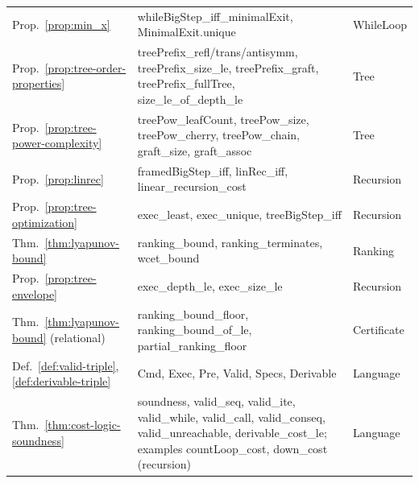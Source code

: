 \documentclass[oneside,english]{amsart}
\numberwithin{equation}{section}
\numberwithin{figure}{section}
\theoremstyle{plain}
\theoremstyle{definition}
\theoremstyle{plain}
\theoremstyle{remark}
\theoremstyle{plain}
\theoremstyle{definition}
\theoremstyle{plain}
\theoremstyle{remark}
\newcommand{\lean}[1]{{\ttfamily\small #1}}
\begin{document}
\begin{table}[ht]
\begin{tabular}{@{}>{\raggedright\arraybackslash}p{}>{\raggedright\arraybackslash}p{}>{\raggedright\arraybackslash}p{}@{}}
Prop.~\ref{prop:min_x} & \lean{whileBigStep\_\allowbreak iff\_\allowbreak minimalExit}, \lean{MinimalExit.\allowbreak unique} & \lean{WhileLoop} \\
Prop.~\ref{prop:tree-order-properties} & \lean{treePrefix\_\allowbreak refl/\allowbreak trans/\allowbreak antisymm}, \lean{treePrefix\_\allowbreak size\_\allowbreak le}, \lean{treePrefix\_\allowbreak graft}, \lean{treePrefix\_\allowbreak fullTree}, \lean{size\_\allowbreak le\_\allowbreak of\_\allowbreak depth\_\allowbreak le} & \lean{Tree} \\
Prop.~\ref{prop:tree-power-complexity} & \lean{treePow\_\allowbreak leafCount}, \lean{treePow\_\allowbreak size}, \lean{treePow\_\allowbreak cherry}, \lean{treePow\_\allowbreak chain}, \lean{graft\_\allowbreak size}, \lean{graft\_\allowbreak assoc} & \lean{Tree} \\
Prop.~\ref{prop:linrec} & \lean{framedBigStep\_\allowbreak iff}, \lean{linRec\_\allowbreak iff}, \lean{linear\_\allowbreak recursion\_\allowbreak cost} & \lean{Recursion} \\
Prop.~\ref{prop:tree-optimization} & \lean{exec\_\allowbreak least}, \lean{exec\_\allowbreak unique}, \lean{treeBigStep\_\allowbreak iff} & \lean{Recursion} \\
Thm.~\ref{thm:lyapunov-bound} & \lean{ranking\_\allowbreak bound}, \lean{ranking\_\allowbreak terminates}, \lean{wcet\_\allowbreak bound} & \lean{Ranking} \\
Prop.~\ref{prop:tree-envelope} & \lean{exec\_\allowbreak depth\_\allowbreak le}, \lean{exec\_\allowbreak size\_\allowbreak le} & \lean{Recursion} \\
Thm.~\ref{thm:lyapunov-bound} (relational) & \lean{ranking\_\allowbreak bound\_\allowbreak floor}, \lean{ranking\_\allowbreak bound\_\allowbreak of\_\allowbreak le}, \lean{partial\_\allowbreak ranking\_\allowbreak floor} & \lean{Certificate} \\
Def.~\ref{def:valid-triple}, \ref{def:derivable-triple} & \lean{Cmd}, \lean{Exec}, \lean{Pre}, \lean{Valid}, \lean{Specs}, \lean{Derivable} & \lean{Language} \\
Thm.~\ref{thm:cost-logic-soundness} & \lean{soundness}, \lean{valid\_\allowbreak seq}, \lean{valid\_\allowbreak ite}, \lean{valid\_\allowbreak while}, \lean{valid\_\allowbreak call}, \lean{valid\_\allowbreak conseq}, \lean{valid\_\allowbreak unreachable}, \lean{derivable\_\allowbreak cost\_\allowbreak le}; examples \lean{countLoop\_\allowbreak cost}, \lean{down\_\allowbreak cost} (recursion) & \lean{Language} \\

\end{tabular}
\end{table}
\end{document}
